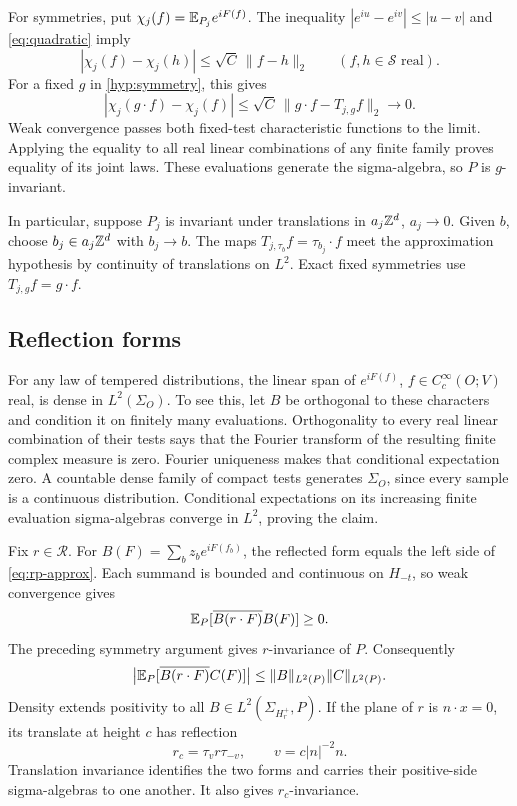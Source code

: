 For symmetries, put \(\chi_j(f)=\mathbb E_{P_j}e^{iF(f)}\).
The inequality \(|e^{iu}-e^{iv}|\le|u-v|\) and
\eqref{eq:quadratic} imply
\begin{equation}\label{eq:character-continuity}
 |\chi_j(f)-\chi_j(h)|\le\sqrt C\,\|f-h\|_2
 \qquad(f,h\in\mathcal S\text{ real}).
\end{equation}
For a fixed \(g\) in \cref{hyp:symmetry}, this gives
\[
 |\chi_j(g\cdot f)-\chi_j(f)|
 \le\sqrt C\,\|g\cdot f-T_{j,g}f\|_2\longrightarrow0.
\]
Weak convergence passes both fixed-test characteristic functions
to the limit. Applying the equality to all real linear combinations
of any finite family proves equality of its joint laws.
These evaluations generate the sigma-algebra, so \(P\) is
\(g\)-invariant.

In particular, suppose \(P_j\) is invariant under translations in
\(a_j\mathbb Z^d\), \(a_j\to0\). Given \(b\), choose \(b_j\in a_j\mathbb Z^d\)
with \(b_j\to b\). The maps
\(T_{j,\tau_b}f=\tau_{b_j}\cdot f\) meet the approximation
hypothesis by continuity of translations on \(L^2\).
Exact fixed symmetries use \(T_{j,g}f=g\cdot f\).

\subsection{Reflection forms}
For any law of tempered distributions, the linear span of
\(e^{iF(f)}\), \(f\in C_c^\infty(O;V)\) real, is dense in
\(L^2(\Sigma_O)\). To see this, let \(B\) be orthogonal to these
characters and condition it on finitely many evaluations.
Orthogonality to every real linear combination of their tests
says that the Fourier transform of the resulting finite complex
measure is zero. Fourier uniqueness makes that conditional
expectation zero. A countable dense family of compact tests
generates \(\Sigma_O\), since every sample is a continuous
distribution. Conditional expectations on its increasing finite
evaluation sigma-algebras converge in \(L^2\), proving the claim.

Fix \(r\in\mathcal R\). For
\(B(F)=\sum_bz_be^{iF(f_b)}\), the reflected form equals
the left side of \eqref{eq:rp-approx}. Each summand is bounded
and continuous on \(H_{-t}\), so weak convergence gives
\[
 \mathbb E_P[\overline{B(r\cdot F)}B(F)]\ge0.
\]
The preceding symmetry argument gives \(r\)-invariance of \(P\).
Consequently
\begin{equation}\label{eq:reflection-form-bound}
 \big|\mathbb E_P[\overline{B(r\cdot F)}C(F)]\big|
 \le\|B\|_{L^2(P)}\|C\|_{L^2(P)}.
\end{equation}
Density extends positivity to all
\(B\in L^2(\Sigma_{H_r^+},P)\).
If the plane of \(r\) is \(n\cdot x=0\), its translate at height
\(c\) has reflection
\[
 r_c=\tau_vr\tau_{-v},\qquad v=c|n|^{-2}n.
\]
Translation invariance identifies the two forms and carries their
positive-side sigma-algebras to one another. It also gives
\(r_c\)-invariance.

